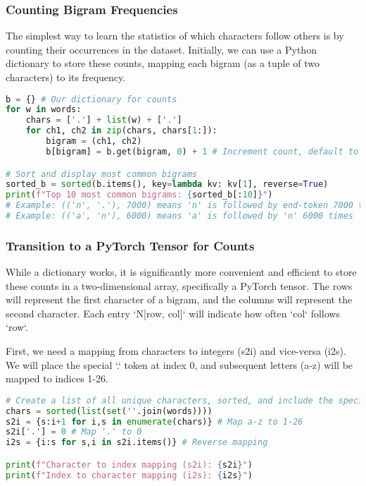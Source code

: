 \subsubsection{Counting Bigram Frequencies}
The simplest way to learn the statistics of which characters follow others is by counting their occurrences in the dataset. Initially, we can use a Python dictionary to store these counts, mapping each bigram (as a tuple of two characters) to its frequency.

\begin{lstlisting}[language=Python, caption=Counting Bigram Frequencies with a Dictionary]
b = {} # Our dictionary for counts
for w in words:
    chars = ['.'] + list(w) + ['.']
    for ch1, ch2 in zip(chars, chars[1:]):
        bigram = (ch1, ch2)
        b[bigram] = b.get(bigram, 0) + 1 # Increment count, default to 0 if new

# Sort and display most common bigrams
sorted_b = sorted(b.items(), key=lambda kv: kv[1], reverse=True)
print(f"Top 10 most common bigrams: {sorted_b[:10]}")
# Example: (('n', '.'), 7000) means 'n' is followed by end-token 7000 times
# Example: (('a', 'n'), 6000) means 'a' is followed by 'n' 6000 times
\end{lstlisting}

\subsubsection{Transition to a PyTorch Tensor for Counts}
While a dictionary works, it is significantly more convenient and efficient to store these counts in a two-dimensional array, specifically a PyTorch tensor. The rows will represent the first character of a bigram, and the columns will represent the second character. Each entry `N[row, col]` will indicate how often `col` follows `row`.

First, we need a mapping from characters to integers (s2i) and vice-versa (i2s). We will place the special `.` token at index 0, and subsequent letters (a-z) will be mapped to indices 1-26.

\begin{lstlisting}[language=Python, caption=Character-to-Integer Mapping]
# Create a list of all unique characters, sorted, and include the special '.' token
chars = sorted(list(set(''.join(words))))
s2i = {s:i+1 for i,s in enumerate(chars)} # Map a-z to 1-26
s2i['.'] = 0 # Map '.' to 0
i2s = {i:s for s,i in s2i.items()} # Reverse mapping

print(f"Character to index mapping (s2i): {s2i}")
print(f"Index to character mapping (i2s): {i2s}")
\end{lstlisting}

